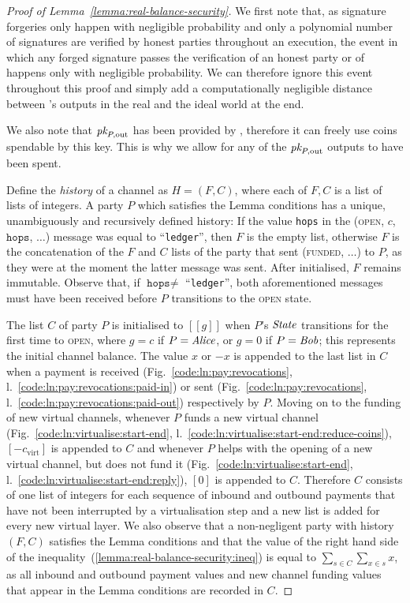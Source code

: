 \begin{proof}[Proof of Lemma~\ref{lemma:real-balance-security}]
  We first note that, as signature forgeries only happen with negligible
  probability and only a polynomial number of signatures are verified by honest
  parties throughout an execution, the event in which any forged signature
  passes the verification of an honest party or of \ledger happens only with
  negligible probability. We can therefore ignore this event throughout this
  proof and simply add a computationally negligible distance between
  \environment's outputs in the real and the ideal world at the end.

  We also note that $\textit{pk}_{P, \mathrm{out}}$ has been provided by \environment,
  therefore it can freely use coins spendable by this key. This is why we allow
  for any of the $\textit{pk}_{P, \mathrm{out}}$ outputs to have been spent.

  Define the \emph{history} of a channel as $H = (F, C)$, where each of $F, C$
  is a list of lists of integers. A party $P$ which satisfies the Lemma
  conditions has a unique, unambiguously and recursively defined history: If the
  value \texttt{hops} in the (\textsc{open}, $c$, $\texttt{hops}$, $\dots$)
  message was equal to ``\texttt{ledger}'', then $F$ is the empty list, otherwise $F$ is the
  concatenation of the $F$ and $C$ lists of the party that sent
  (\textsc{funded}, $\dots$) to $P$, as they were at the moment the latter
  message was sent. After initialised, $F$ remains immutable. Observe that, if
  $\texttt{hops} \neq$ ``\texttt{ledger}'', both aforementioned messages must have been
  received before $P$ transitions to the \textsc{open} state.

  The list $C$ of party $P$ is initialised to $[[g]]$ when $P$'s $\itistate$
  transitions for the first time to \textsc{open}, where $g = c$ if $P =
  \mathit{Alice}$, or $g = 0$ if $P = \mathit{Bob}$; this represents the initial channel
  balance. The value $x$ or $-x$ is appended to the last list in $C$ when a
  payment is received (Fig.~\ref{code:ln:pay:revocations},
  l.~\ref{code:ln:pay:revocations:paid-in}) or sent
  (Fig.~\ref{code:ln:pay:revocations},
  l.~\ref{code:ln:pay:revocations:paid-out}) respectively by $P$. Moving on to
  the funding of new virtual channels, whenever $P$ funds a new virtual channel
  (Fig.~\ref{code:ln:virtualise:start-end},
  l.~\ref{code:ln:virtualise:start-end:reduce-coins}), $[-c_{\mathrm{virt}}]$
  is appended to $C$ and whenever $P$ helps with the opening of a new virtual
  channel, but does not fund it (Fig.~\ref{code:ln:virtualise:start-end},
  l.~\ref{code:ln:virtualise:start-end:reply}), $[0]$ is appended to $C$.
  Therefore $C$ consists of one list of integers for each sequence of inbound
  and outbound payments that have not been interrupted by a virtualisation step
  and a new list is added for every new virtual layer. We also observe that a
  non-negligent party with history $(F, C)$ satisfies the Lemma conditions and
  that the value of the right hand side of the
  inequality~(\ref{lemma:real-balance-security:ineq}) is equal to
  $\sum\limits_{s \in C} \sum\limits_{x \in s} x$, as all inbound and outbound
  payment values and new channel funding values that appear in the Lemma
  conditions are recorded in $C$.


\end{proof}
